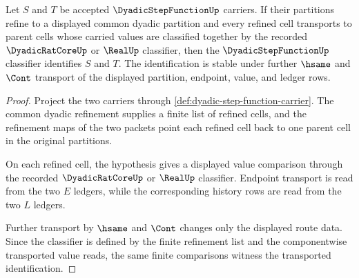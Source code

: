 \begin{theorem}
\label{thm:dyadic-step-function-refinement-stability}
Let $S$ and $T$ be accepted $\DyadicStepFunctionUp$ carriers. If their partitions refine to a displayed common dyadic partition and every refined cell transports to parent cells whose carried values are classified together by the recorded $\DyadicRatCoreUp$ or $\RealUp$ classifier, then the $\DyadicStepFunctionUp$ classifier identifies $S$ and $T$. The identification is stable under further $\hsame$ and $\Cont$ transport of the displayed partition, endpoint, value, and ledger rows.
\end{theorem}
\begin{proof}
Project the two carriers through \autoref{def:dyadic-step-function-carrier}. The common dyadic refinement supplies a finite list of refined cells, and the refinement maps of the two packets point each refined cell back to one parent cell in the original partitions.

On each refined cell, the hypothesis gives a displayed value comparison through the recorded $\DyadicRatCoreUp$ or $\RealUp$ classifier. Endpoint transport is read from the two $E$ ledgers, while the corresponding history rows are read from the two $L$ ledgers.

Further transport by $\hsame$ and $\Cont$ changes only the displayed route data. Since the classifier is defined by the finite refinement list and the componentwise transported value reads, the same finite comparisons witness the transported identification.
\end{proof}

